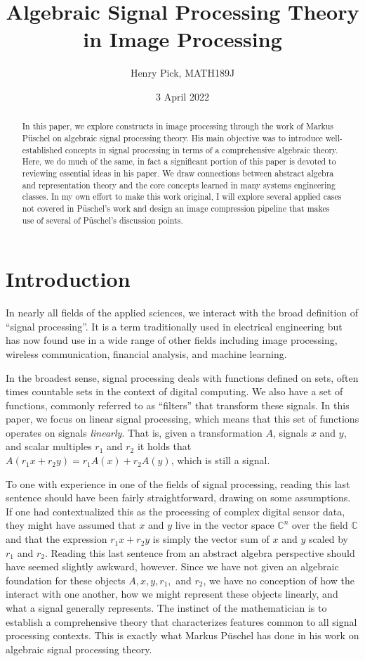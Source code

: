 \documentclass[12pt,technote]{IEEEtran}
\author{Henry Pick, MATH189J}
\title{Algebraic Signal Processing Theory in Image Processing}
\date{3 April 2022}
\begin{document}
\maketitle
\begin{abstract}
    In this paper, we explore constructs in image processing through the work of Markus P\"uschel on algebraic signal processing theory. His main objective was to introduce well-established concepts in signal processing in terms of a comprehensive algebraic theory. Here, we do much of the same, in fact a significant portion of this paper is devoted to reviewing essential ideas in his paper. We draw connections between abstract algebra and representation theory and the core concepts learned in many systems engineering classes. In my own effort to make this work original, I will explore several applied cases not covered in P\"uschel's work and design an image compression pipeline that makes use of several of P\"uschel's discussion points.
\end{abstract}
\section{Introduction}
In nearly all fields of the applied sciences, we interact with the broad definition of ``signal processing''. It is a term traditionally used in electrical engineering but has now found use in a wide range of other fields including image processing, wireless communication, financial analysis, and machine learning. 

In the broadest sense, signal processing deals with functions defined on sets, often times countable sets in the context of digital computing. We also have a set of functions, commonly referred to as ``filters'' that transform these signals. In this paper, we focus on linear signal processing, which means that this set of functions operates on signals \textit{linearly}. That is, given a transformation $A$, signals $x$ and $y$, and scalar multiples $r_1$ and $r_2$ it holds that $A(r_1x + r_2y) = r_1A(x) + r_2A(y)$, which is still a signal.

To one with experience in one of the fields of signal processing, reading this last sentence should have been fairly straightforward, drawing on some assumptions. If one had contextualized this as the processing of complex digital sensor data, they might have assumed that $x$ and $y$ live in the vector space $\mathbb{C}^n$ over the field $\mathbb{C}$ and that the expression $r_1x + r_2y$ is simply the vector sum of $x$ and $y$ scaled by $r_1$ and $r_2$. Reading this last sentence from an abstract algebra perspective should have seemed slightly awkward, however. Since we have not given an algebraic foundation for these objects $A, x, y, r_1,$ and $r_2$, we have no conception of how the interact with one another, how we might represent these objects linearly, and what a signal generally represents. The instinct of the mathematician is to establish a comprehensive theory that characterizes features common to all signal processing contexts. This is exactly what Markus P\"uschel has done in his work on algebraic signal processing theory\cite{AlgebraicSignalProcessing2006}.
\end{document}
